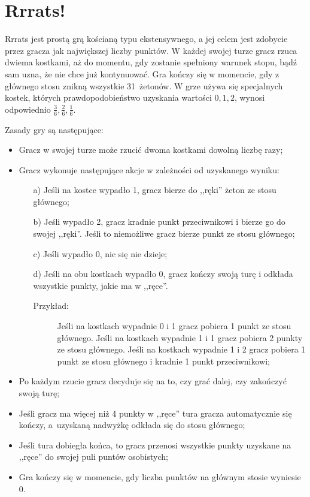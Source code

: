 \documentclass[inzynierska]{pwr_wmat_praca_dyplomowa}
\theoremstyle{plain}
\numberwithin{theorem}{chapter}
\theoremstyle{definition}
\numberwithin{theorem}{chapter}
\begin{document}
	\section{Rrrats!}
	Rrrats jest prostą grą kościaną typu ekstensywnego, a jej celem jest zdobycie przez gracza jak największej liczby punktów. W każdej swojej turze gracz rzuca dwiema kostkami, aż do momentu, gdy zostanie spełniony warunek stopu, bądź sam uzna, że nie chce już kontynuować. Gra kończy się w momencie, gdy z głównego stosu znikną wszystkie 31~żetonów. W grze używa się specjalnych kostek, których prawdopodobieństwo uzyskania wartości $0, 1, 2$, wynosi odpowiednio $\frac{3}{6}, \frac{2}{6}, \frac{1}{6}$.

	Zasady gry są następujące:
	\begin{itemize}[]
		\item Gracz w swojej turze może rzucić dwoma kostkami dowolną liczbę razy;
		\item  Gracz wykonuje następujące akcje w zależności od uzyskanego wyniku:
		\begin{enumerate}
			\item[a)] Jeśli na kostce wypadło 1, gracz bierze do ,,ręki'' żeton ze stosu głównego;
			\item[b)] Jeśli wypadło 2, gracz kradnie punkt przeciwnikowi i bierze go do swojej ,,ręki''. Jeśli to niemożliwe gracz bierze punkt ze stosu głównego;
			\item[c)] Jeśli wypadło 0, nic się nie dzieje;
			\item[d)] Jeśli na obu kostkach wypadło 0, gracz kończy swoją turę i odkłada wszystkie punkty, jakie ma w ,,ręce''.
			\begin{description}
				\item[Przykład:] Jeśli na kostkach wypadnie 0 i 1 gracz pobiera 1 punkt ze stosu głównego. Jeśli na kostkach wypadnie 1 i 1 gracz pobiera 2 punkty ze stosu głównego. Jeśli na kostkach wypadnie 1 i 2 gracz pobiera 1 punkt ze stosu głównego i kradnie 1 punkt przeciwnikowi; 
			\end{description}		
		\end{enumerate}
		\item Po każdym rzucie gracz decyduje się na to, czy grać dalej, czy zakończyć swoją turę;
		
		\item Jeśli gracz ma więcej niż 4 punkty w ,,ręce'' tura gracza automatycznie się kończy, a~uzyskaną nadwyżkę odkłada się do stosu głównego;
		
		\item Jeśli tura dobiegła końca, to gracz przenosi wszystkie punkty uzyskane na ,,ręce'' do swojej puli puntów osobistych;
		
		\item Gra kończy się w momencie, gdy liczba punktów na głównym stosie wyniesie 0.
	\end{itemize}
\end{document}
